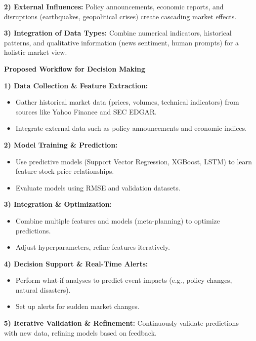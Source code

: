 \begin{table}[thb]
\begin{small}
{\begin{minipage}{0.45\textwidth}
\textbf{2) External Influences:} Policy announcements, economic reports, and disruptions (earthquakes, geopolitical crises) create cascading market effects.

\textbf{3) Integration of Data Types:} Combine numerical indicators, historical patterns, and qualitative information (news sentiment, human prompts) for a holistic market view.

\textbf{Proposed Workflow for Decision Making}

\textbf{1) Data Collection \& Feature Extraction:}
\begin{itemize}[leftmargin=1em, topsep=-.1pt, itemsep=-.1pt, label=-]
\item Gather historical market data (prices, volumes, technical indicators) from sources like Yahoo Finance and SEC EDGAR.
\item Integrate external data such as policy announcements and economic indices.
\end{itemize}

\textbf{2) Model Training \& Prediction:}
\begin{itemize}[leftmargin=1em, topsep=-.1pt, itemsep=-.1pt, label=-]
\item Use predictive models (Support Vector Regression, XGBoost, LSTM) to learn feature-stock price relationships.
\item Evaluate models using RMSE and validation datasets.
\end{itemize}

\textbf{3) Integration \& Optimization:}
\begin{itemize}[leftmargin=1em, topsep=-.1pt, itemsep=-.1pt, label=-]
\item Combine multiple features and models (meta-planning) to optimize predictions.
\item Adjust hyperparameters, refine features iteratively.
\end{itemize}

\textbf{4) Decision Support \& Real-Time Alerts:}
\begin{itemize}[leftmargin=1em, topsep=-.1pt, itemsep=-.1pt, label=-]
\item Perform what-if analyses to predict event impacts (e.g., policy changes, natural disasters).
\item Set up alerts for sudden market changes.
\end{itemize}

\textbf{5) Iterative Validation \& Refinement:} Continuously validate predictions with new data, refining models based on feedback.

\end{minipage}
}
\end{small}
\end{table}